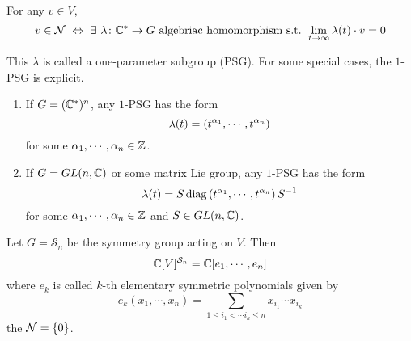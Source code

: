 \documentclass[a4paper,12pt]{article}
\begin{document}
	\begin{thm}
		For any $v \in V$,
		\begin{equation*}
			v \in \mathcal{N} ~\Leftrightarrow~ \exists~\lambda \colon \mathbb{C}^{*} \rightarrow G \text{ algebriac homomorphism s.t. } \lim_{t \rightarrow \infty}\lambda(t) \cdot v =0
		\end{equation*}
	\end{thm}
	\begin{rem}
		This $\lambda$ is called a one-parameter subgroup (PSG). For some special cases, the $1$-PSG is explicit.
		\begin{enumerate}
			\item If $G = (\mathbb{C}^*)^n$, any $1$-PSG has the form
			\begin{equation*}
				\lambda(t) = \left(t^{\alpha_1},\cdots,t^{\alpha_n}\right)
			\end{equation*}
			for some ${\alpha_1},\cdots,{\alpha_n} \in \mathbb{Z}$.
			\item If $G = GL(n,\mathbb{C})$ or some matrix Lie group, any $1$-PSG has the form
			\begin{equation*}
				\lambda(t) = S\operatorname{diag}\left(t^{\alpha_1},\cdots,t^{\alpha_n}\right)S^{-1}
			\end{equation*}
			for some ${\alpha_1},\cdots,{\alpha_n} \in \mathbb{Z}$ and $S \in GL(n,\mathbb{C})$.
		\end{enumerate}
	\end{rem}

	\begin{exam}
		Let $G=\mathcal{S}_n$ be the symmetry group acting on $V$. Then
		\begin{equation*}
			\mathbb{C}[V]^{\mathcal{S}_n} = \mathbb{C}[e_1,\cdots,e_n]
		\end{equation*}
		where $e_k$ is called $k$-th elementary symmetric polynomials given by
		\begin{equation*}
			e_k(x_1,\cdots,x_n) = \sum_{1\leqslant i_1 < \cdots i_k \leqslant n}x_{i_1}\cdots x_{i_k}
		\end{equation*}
		the $\mathcal{N} = \left\{0\right\}$.
	\end{exam}
\end{document}
